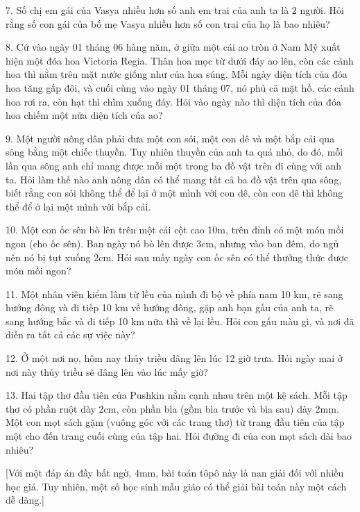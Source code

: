 \begin{problem}{7.}
	Số chị em gái của Vasya nhiều hơn số anh em trai của anh ta là 2 người. Hỏi rằng số con gái của bố mẹ  Vasya nhiều hơn số con trai của họ  là bao nhiêu?
\end{problem}

\begin{problem}{8.}
	Cứ vào ngày 01 tháng 06 hàng năm, ở giữa một cái ao tròn ở Nam Mỹ xuất hiện một đóa hoa Victoria Regia. Thân hoa mọc từ dưới đáy ao lên, còn các cánh hoa thì nằm trên mặt nước giống như của  hoa súng. Mỗi ngày diện tích của đóa hoa  tăng gấp đôi, và cuối cùng vào ngày 01 tháng 07, nó phủ cả mặt hồ, các cánh hoa rơi ra, còn hạt thì chìm xuống đáy. Hỏi vào ngày nào thì diện tích của đóa hoa chiếm một nửa  diện tích của  ao?
\end{problem}

\begin{problem}{9.}
	Một người nông dân phải đưa một con sói, một con dê và một bắp cải qua sông bằng một chiếc thuyền. Tuy nhiên thuyền của anh ta quá nhỏ, do đó, mỗi lần qua sông anh chỉ mang được mỗi một trong ba đồ vật trên đi cùng với anh ta. Hỏi làm thế nào anh nông dân có thể mang tất cả ba đồ vật trên qua sông, biết rằng con sói không thể để lại ở  một mình với con dê, còn con dê thì không thể để ở lại một mình với bắp cải.
\end{problem}

\begin{problem}{10.}
	Một con ốc sên bò lên trên một cái cột cao 10m, trên đỉnh có một món mồi ngon (cho ốc sên).  Ban ngày nó bò lên được 3cm, nhưng vào ban đêm, do ngủ nên nó bị tụt xuống 2cm. Hỏi sau mấy ngày con ốc sên có thể thưởng thức được món mồi ngon?
\end{problem}

\begin{problem}{11.}
	Một nhân viên kiểm lâm từ lều của mình  đi bộ về phía nam 10 km,  rẽ sang hướng đông và đi tiếp 10 km về hướng đông, gặp anh bạn gấu của anh ta, rẽ sang hướng bắc và đi tiếp 10 km nữa thì về lại lều. Hỏi con gấu màu gì, và nơi đã diễn ra tất cả các sự việc này?
\end{problem}

\begin{problem}{12.}
	Ở một nơi nọ,  hôm nay thủy triều dâng lên lúc 12 giờ trưa. Hỏi ngày mai ở nơi này thủy triều sẽ dâng lên vào lúc mấy giờ?
\end{problem}

\begin{problem}{13.}
	Hai tập thơ đầu tiên của Pushkin nằm cạnh nhau trên một kệ sách. Mỗi tập thơ có phần  ruột dày 2cm, còn phần bìa (gồm bìa trước và bìa sau) dày 2mm. Một con mọt sách gặm (vuông góc với các trang thơ) từ trang đầu tiên của tập một cho đến trang cuối cùng của tập hai. Hỏi đường đi của con mọt sách dài bao nhiêu?

	[Với một đáp án đầy bất ngờ, 4mm, bài toán tôpô này là nan giải đối với nhiều học giả. Tuy nhiên,  một số học sinh mẫu giáo có thể giải bài toán này một cách dễ dàng.]
\end{problem}

